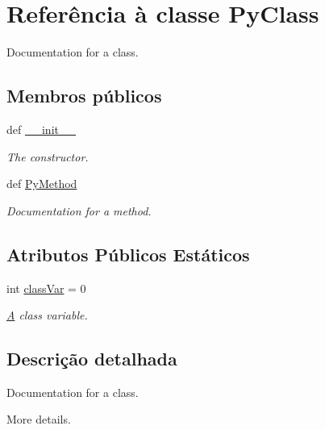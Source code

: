 \hypertarget{classpyexample_1_1_py_class}{\section{Referência à classe Py\-Class}
\label{classpyexample_1_1_py_class}
}


Documentation for a class.  


\subsection*{Membros públicos}
\begin{DoxyCompactItemize}
\item 
def \hyperlink{classpyexample_1_1_py_class_ac775ee34451fdfa742b318538164070e}{\-\_\-\-\_\-init\-\_\-\-\_\-}
\begin{DoxyCompactList}\small\item\em The constructor. \end{DoxyCompactList}\item 
def \hyperlink{classpyexample_1_1_py_class_a5fbda20f8abe70b881ed325ff74b183b}{Py\-Method}
\begin{DoxyCompactList}\small\item\em Documentation for a method. \end{DoxyCompactList}\end{DoxyCompactItemize}
\subsection*{Atributos Públicos Estáticos}
\begin{DoxyCompactItemize}
\item 
int \hyperlink{classpyexample_1_1_py_class_af4cea5ee982f0598f7393af0cd670fc5}{class\-Var} = 0
\begin{DoxyCompactList}\small\item\em \hyperlink{class_a}{A} class variable. \end{DoxyCompactList}\end{DoxyCompactItemize}


\subsection{Descrição detalhada}
Documentation for a class. 

More details. 

